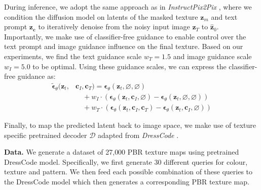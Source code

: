 \documentclass[11pt,twocolumn]{article}
\begin{document}
During inference, we adopt the same approach as in \textit{InstructPix2Pix} \cite{instructpix2pix}, 
where we condition the diffusion model on latents of the masked texture $\mathbf{z}_m$ and text prompt 
$\mathbf{z_c}$ to iteratively denoise from the noisy input image $\mathbf{z}_T$ to $\hat{\mathbf{z}}_0$. 
Importantly, we make use of classifier-free guidance \cite{cfg} to enable control over the text prompt and 
image guidance influence on the final texture. Based on our experiments, we find the text guidance scale $w_T = 1.5$ 
and image guidance scale $w_I = 5.0$ to be optimal. Using these guidance scales, we can express the classifier-free guidance as:
\vspace{0.0em}
\begin{align*}
  \tilde{\boldsymbol{\epsilon}}_{\theta}(\mathbf{z}_t, &\mathbf{c}_I, \mathbf{c}_T) = \boldsymbol{\epsilon}_{\theta}(\mathbf{z}_t, \varnothing, \varnothing) \\
  &\quad + w_I \cdot \left( \boldsymbol{\epsilon}_{\theta}(\mathbf{z}_t, \mathbf{c}_I, \varnothing) - \boldsymbol{\epsilon}_{\theta}(\mathbf{z}_t, \varnothing, \varnothing) \right) \tag{4} \\
  &\quad + w_T \cdot \left( \boldsymbol{\epsilon}_{\theta}(\mathbf{z}_t, \mathbf{c}_I, \mathbf{c}_T) - \boldsymbol{\epsilon}_{\theta}(\mathbf{z}_t, \mathbf{c}_I, \varnothing) \right)
\end{align*}


Finally, to map the predicted latent back to image space, we make use of texture specific pretrained 
decoder $\mathcal{D}$ adapted from \textit{DressCode} \cite{dresscode}.


\textbf{Data.} We generate a dataset of 27{,}000 PBR texture maps using pretrained DressCode \cite{dresscode} model. Specifically,
we first generate 30 different queries for colour, texture and pattern. We then feed each possible combination of these
queries to the DressCode model which then generates a corresponding PBR texture map.







\end{document}
